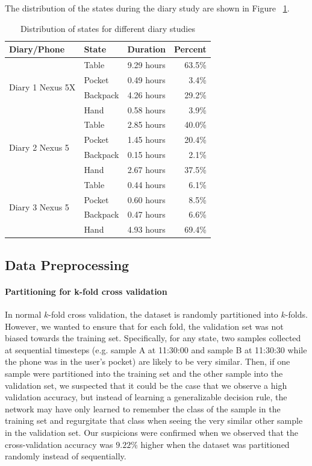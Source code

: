 The distribution of the states during the diary study are shown in Figure ~\ref{tab:diarydistr}.


\begin{table}[h]
\caption{Distribution of states for different diary studies} \label{tab:diarydistr} 
\centering

\begin{tabular}{llcr } 
 Diary/Phone & State & Duration & Percent\\
 \toprule
 \multirow{4}{1.4cm}{ Diary 1 Nexus 5X} &
 Table & 9.29 hours & 63.5\%  \\ 
 & Pocket & 0.49 hours & 3.4\% \\ 
 & Backpack &  4.26 hours  &  29.2\% \\ 
 & Hand & 0.58 hours  & 3.9\% \\
 \midrule
 \multirow{4}{1.4cm}{\centering Diary 2 Nexus 5} &
 Table & 2.85 hours & 40.0\%  \\ 
 & Pocket & 1.45 hours & 20.4\% \\ 
 & Backpack &  0.15 hours  &  2.1\% \\ 
 & Hand & 2.67 hours  & 37.5\% \\
  \midrule
 \multirow{4}{1.4cm}{\centering Diary 3 Nexus 5} &
 Table & 0.44 hours & 6.1\%  \\ 
 & Pocket & 0.60 hours & 8.5\% \\ 
 & Backpack &  0.47 hours &  6.6\% \\ 
 & Hand & 4.93 hours  & 69.4\% \\
\bottomrule
\end{tabular}
\end{table}

\subsection{Data Preprocessing}
\paragraph{Partitioning for k-fold cross validation}
In normal $k$-fold cross validation, the dataset is randomly partitioned into
$k$-folds. However, we wanted to ensure that for each fold, the validation set
was not biased towards the training set. Specifically, for any state, two samples collected at sequential timesteps
(e.g. sample A at 11:30:00 and sample B at 11:30:30 while the phone was in 
the user's pocket) are likely to be very similar. Then, if one sample 
were partitioned into the training set and the other sample into the validation set, we suspected
that it could be the case that we observe a high validation accuracy, but instead of learning 
a generalizable decision rule, the network may have only learned to remember the class of the sample in the training set 
and regurgitate that class when seeing the very similar other sample in the validation set. 
Our suspicions were confirmed when we observed that the cross-validation accuracy
was $9.22\%$ higher when the dataset was partitioned randomly instead of sequentially.

